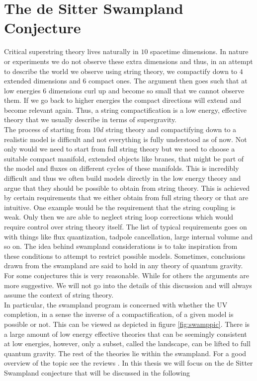 \documentclass[12pt]{report}
\begin{document}
\chapter{The de Sitter Swampland Conjecture}
Critical superstring theory lives naturally in $10$ spacetime dimensions. In nature or experiments we do not observe these extra dimensions and thus, in an attempt to describe the world we observe using string theory, we compactify down to $4$ extended dimensions and $6$ compact ones. The argument then goes such that at low energies $6$ dimensions curl up and become so small that we cannot observe them. If we go back to higher energies the compact directions will extend and become relevant again. Thus, a string compactification is a low energy, effective theory that we usually describe in terms of supergravity.\\
The process of starting from $10d$ string theory and compactifying down to a realistic model is difficult and not everything is fully understood as of now. Not only would we need to start from full string theory but we need to choose a suitable compact manifold, extended objects like branes, that might be part of the model and fluxes on different cycles of these manifolds. This is incredibly difficult and thus we often build models directly in the low energy theory and argue that they should be possible to obtain from string theory. This is achieved by certain requirements that we either obtain from full string theory or that are intuitive. One example would be the requirement that the string coupling is weak. Only then we are able to neglect string loop corrections which would require control over string theory itself. The list of typical requirements goes on with things like flux quantization, tadpole cancellation, large internal volume and so on. The idea behind swampland considerations is to take inspiration from these conditions to attempt to restrict possible models. Sometimes, conclusions drawn from the swampland are said to hold in any theory of quantum gravity. For some conjectures this is very reasonable. While for others the arguments are more suggestive. We will not go into the details of this discussion and will always assume the context of string theory.\\
In particular, the swampland program is concerned with whether the UV completion, in a sense the inverse of a compactification, of a given model is possible or not. This can be viewed as depicted in figure \ref{fig:swamppic}. There is a large amount of low energy effective theories that can be seemingly consistent at low energies, however, only a subset, called the landscape, can be lifted to full quantum gravity. The rest of the theories lie within the swampland. For a good overview of the topic see the reviews \cite{Palti:2019pca,vanBeest:2021lhn}. In this thesis we will focus on the de Sitter Swampland conjecture that will be discussed in the following
\end{document}
